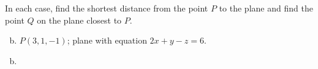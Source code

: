 \documentclass[../main.tex]{subfiles}
\begin{document}
In each case, find the shortest distance from the point $P$ to the plane and find the point $Q$ on the plane closest to $P$.
\begin{enumerate}[a)]
	\setcounter{enumi}{1}
	\item $P(3, 1, -1)$; plane with equation $2x + y - z = 6$.
\end{enumerate}

\solution
\begin{enumerate}[a)]
	\setcounter{enumi}{1}
	\item 
\end{enumerate}
\end{document}
